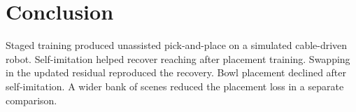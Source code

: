 \section{Conclusion}\label{sec:conclusion}
Staged training produced unassisted pick-and-place on a simulated cable-driven robot. Self-imitation helped recover reaching after placement training. Swapping in the updated residual reproduced the recovery. Bowl placement declined after self-imitation. A wider bank of scenes reduced the placement loss in a separate comparison.
